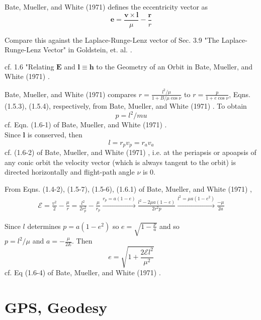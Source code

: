 \documentclass[10pt]{amsart}
\begin{document}
\begin{multicols*}{2}
Bate, Mueller, and White (1971) \cite{BMW1971} defines the eccentricity vector as 
\[
\mathbf{e} = \frac{ \mathbf{v} \times \mathbf{l} }{ \mu} - \frac{\mathbf{r}}{r}
\]

Compare this against the Laplace-Runge-Lenz vector of Sec. 3.9 "The Laplace-Runge-Lenz Vector" in Goldstein, et. al. \cite{HGoldsteinCPooleJSafko2001}.

cf. 1.6 "Relating $\mathbf{E}$ and $\mathbf{l} \equiv \mathbf{h}$ to the Geometry of an Orbit in Bate, Mueller, and White (1971) \cite{BMW1971}.

Bate, Mueller, and White (1971) \cite{BMW1971} compares $r = \frac{ l^2 / \mu}{ 1 + B/\mu \cos{\nu }} $  to $r = \frac{p}{ 1 + e \cos{\nu}} $, Eqns. (1.5.3), (1.5.4), respectively, from Bate, Mueller, and White (1971) \cite{BMW1971}. To obtain
\begin{equation}
	p = l^2 /mu 
\end{equation}
cf. Eqn. (1.6-1) of Bate, Mueller, and White (1971) \cite{BMW1971}.  \\

Since $\mathbf{l}$ is conserved, then 
\begin{equation}
	l = r_p v_p = r_a v_a
\end{equation}
cf. (1.6-2) of Bate, Mueller, and White (1971) \cite{BMW1971}, i.e. at the periapsis or apoapsis of any conic orbit the velocity vector (which is always tangent to the orbit) is directed horizontally and flight-path angle $\nu$ is $0$.

From Eqns. (1.4-2), (1.5-7), (1.5-6), (1.6.1) of Bate, Mueller, and White (1971) \cite{BMW1971},
\[
\begin{gathered}
	\mathcal{E} = \frac{v^2}{2 }  - \frac{\mu}{r} = \frac{l^2}{ 2 r_p^2 } - \frac{\mu}{r_p} \xrightarrow{r_p = a(1-e) }  \frac{ l^2 - 2\mu a(1-e) }{ 2 r^2 p} \xrightarrow{ l^2 = \mu a ( 1- e^2) } \frac{- \mu}{2 a}
\end{gathered}
\]

Since $l$ determines $p = a(1-e^2)$ so $e = \sqrt{ 1 - \frac{p}{a} }$ and so \\
$p = l^2 / \mu$ and $a = - \frac{\mu}{2E}$. Then 
\begin{equation}
	e = \sqrt{ 1 + \frac{2 \mathcal{E} l^2 }{\mu^2} }
\end{equation}
cf. Eq (1.6-4) of Bate, Mueller, and White (1971) \cite{BMW1971}.

\part{GPS, Geodesy} 


\end{multicols*}
\end{document}
